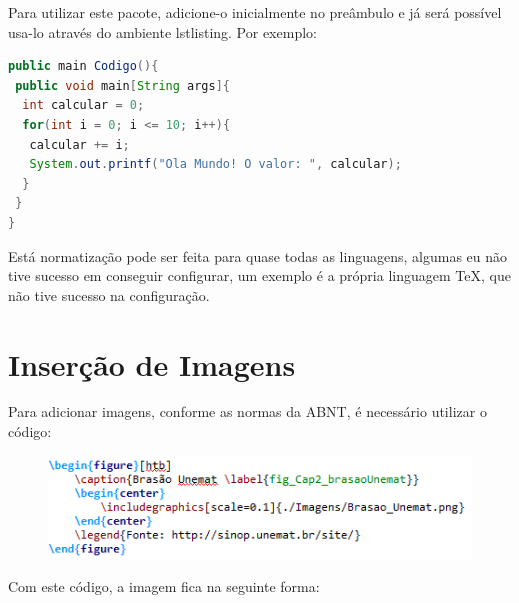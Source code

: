Para utilizar este pacote, adicione-o inicialmente no preâmbulo e já será possível usa-lo através do ambiente lstlisting. Por exemplo:
\begin{lstlisting}[language = Java]
public main Codigo(){
 public void main[String args]{
  int calcular = 0;
  for(int i = 0; i <= 10; i++){
   calcular += i;
   System.out.printf("Ola Mundo! O valor: ", calcular);
  }
 }
}
\end{lstlisting}

Está normatização pode ser feita para quase todas as linguagens, algumas eu não tive sucesso em conseguir configurar, um exemplo é a própria linguagem TeX, que não tive sucesso na configuração. 
\section{Inserção de Imagens}
Para adicionar imagens, conforme as normas da ABNT, é necessário utilizar o código:

\begin{figure}[htb]
	\begin{center}
		\includegraphics[scale=1]{./Imagens/capitulo_2/code_5.png}
	\end{center}
\end{figure}

Com este código, a imagem fica na seguinte forma:

